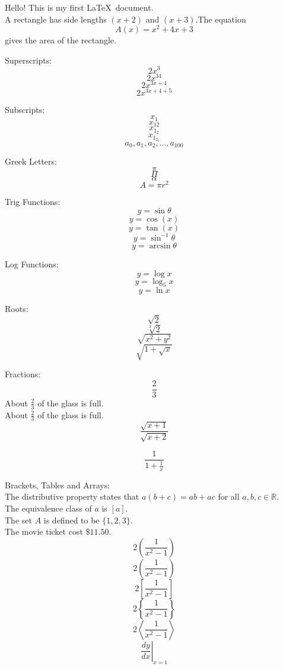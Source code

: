 \documentclass[11pt]{article}
\begin{document}
Hello! This is my first \LaTeX\ document. \\[6pt]
A rectangle has side lengths $(x+2)$ and $(x+3)$.The equation $${A(x)=x^2+4x+3}$$ gives the area of the rectangle.

Superscripts:
$$2x^3$$
$$2x^{34}$$
$$2x^{3x+4}$$
$$2x^{3x+4+5}$$

Subscripts:
$$x_1$$
$$x_{12}$$
$$x_{1_2}$$
$$x_{1_{2_3}}$$
$$a_0, a_1, a_2, \ldots, a_{100}$$

Greek Letters:
$$\pi$$
$$\Pi$$
$$\alpha$$
$$A = \pi r^2$$

Trig Functions:
$$y = \sin \theta$$
$$y = \cos (x)$$
$$y = \tan (x)$$
$$y = \sin^ {-1} \theta$$
$$y = \arcsin \theta$$

Log Functions:
$$y=\log x$$
$$y=\log_5 x$$
$$y=\ln x$$

Roots:
$$\sqrt{2}$$
$$\sqrt[3]{2}$$
$$\sqrt{x^2 + y^2}$$
$$\sqrt{1 + \sqrt{x}}$$

Fractions:
$$\frac{2}{3}$$
About $\displaystyle \frac{2}{3}$ of the glass is full.\\[6pt]
About $\frac{2}{3}$ of the glass is full.\\[6pt]
$$\frac{\sqrt{x+1}}{\sqrt{x+2}}$$

$$\frac{1}{1+\frac{1}{x}}$$

Brackets, Tables and Arrays:\\[6pt]
The distributive property states that $a(b+c)=ab+ac$ for all $a,b,c \in \mathbb{R}$. \\[6pt]
The equivalence class of $a$ is $[a]$.\\[6pt]
The set $A$ is defined to be $\{1,2,3\}$.\\[6pt]
The movie ticket cost $\$11.50$.
$$2(\frac{1}{x^2-1})$$
$$2\left(\frac{1}{x^2-1}\right)$$
$$2\left[\frac{1}{x^2-1}\right]$$
$$2\left\{\frac{1}{x^2-1}\right\}$$
$$2\left \langle \frac{1}{x^2-1}\right \rangle$$
$$\left. \frac{dy}{dx} \right|_{x=1}$$
\end{document}
